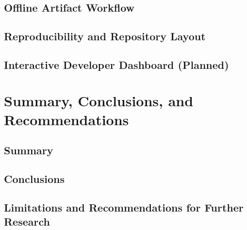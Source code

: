 \documentclass{IEEEtran}
\begin{document}
\subsection{Oﬄine Artifact Workflow}
\subsection{Reproducibility and Repository Layout}
\subsection{Interactive Developer Dashboard (Planned)}
\section{Summary, Conclusions, and Recommendations}
\subsection{Summary}
\subsection{Conclusions}
\subsection{Limitations and Recommendations for Further Research}
\end{document}
